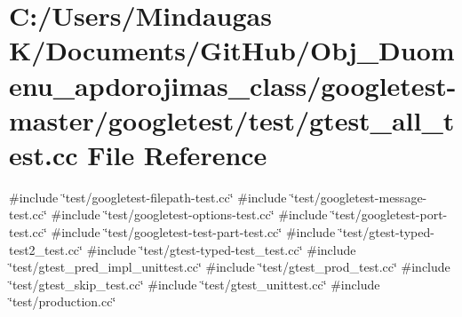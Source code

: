 \hypertarget{googletest-master_2googletest_2test_2gtest__all__test_8cc}{}\section{C\+:/\+Users/\+Mindaugas K/\+Documents/\+Git\+Hub/\+Obj\+\_\+\+Duomenu\+\_\+apdorojimas\+\_\+class/googletest-\/master/googletest/test/gtest\+\_\+all\+\_\+test.cc File Reference}
\label{googletest-master_2googletest_2test_2gtest__all__test_8cc}
{\ttfamily \#include \char`\"{}test/googletest-\/filepath-\/test.\+cc\char`\"{}}\newline
{\ttfamily \#include \char`\"{}test/googletest-\/message-\/test.\+cc\char`\"{}}\newline
{\ttfamily \#include \char`\"{}test/googletest-\/options-\/test.\+cc\char`\"{}}\newline
{\ttfamily \#include \char`\"{}test/googletest-\/port-\/test.\+cc\char`\"{}}\newline
{\ttfamily \#include \char`\"{}test/googletest-\/test-\/part-\/test.\+cc\char`\"{}}\newline
{\ttfamily \#include \char`\"{}test/gtest-\/typed-\/test2\+\_\+test.\+cc\char`\"{}}\newline
{\ttfamily \#include \char`\"{}test/gtest-\/typed-\/test\+\_\+test.\+cc\char`\"{}}\newline
{\ttfamily \#include \char`\"{}test/gtest\+\_\+pred\+\_\+impl\+\_\+unittest.\+cc\char`\"{}}\newline
{\ttfamily \#include \char`\"{}test/gtest\+\_\+prod\+\_\+test.\+cc\char`\"{}}\newline
{\ttfamily \#include \char`\"{}test/gtest\+\_\+skip\+\_\+test.\+cc\char`\"{}}\newline
{\ttfamily \#include \char`\"{}test/gtest\+\_\+unittest.\+cc\char`\"{}}\newline
{\ttfamily \#include \char`\"{}test/production.\+cc\char`\"{}}\newline
